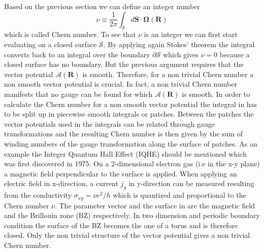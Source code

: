 \documentclass[a4paper,11pt]{report}
\begin{document}
Based on the previous section we can define an integer number
\begin{equation}\label{eq:3}
 \nu \equiv \frac{1}{2\pi}\int_\mathcal{S}d\bm{S}\cdot\bm{\Omega}(\bm{R})
\end{equation}
which is called Chern number. To see that $\nu$ is an integer we can first start evaluating  on a closed surface $\mathcal{S}$. By applying
again Stokes' theorem the integral converts back to an integral over the boundary $\partial \mathcal{S}$ which gives $\nu = 0$ because a closed 
surface has no boundary. But the previous argument requires that the vector potential $\bm{\mathcal{A}}(\bm{R})$ is smooth. Therefore, for a non trivial
Chern number a non smooth vector potential is crucial. In fact, a non trivial Chern number manifests that no gauge can be found for which 
$\bm{\mathcal{A}}(\bm{R})$ is smooth. In order to calculate the Chern number for a non smooth vector potential the integral in  has to
be split up in piecewise smooth integrals or patches. Between the patches the vector potentials used in the integrals can be related through gauge
transformations and the resulting Chern number is then given by the sum of winding numbers of the gauge transformation along the 
surface of patches\cite[p.31]{Bernevig2013}.
As an example the Integer Quantum Hall Effect (IQHE) should be mentioned which was first discovered in 1975. On a 2-dimensional electron gas (i.e in the x-y plane)
a magnetic field perpendicular to the surface is applied. When applying an electric field in x-direction, a current $j_y$ in y-direction
can be measured resulting from the conductivity $\sigma_{xy} = \nu e^2/h$ which is quantized and proportional to the Chern number $\nu$. 
The parameter vector and the surface in  are the magnetic field and
the Brillouin zone (BZ) respectively. In two dimension and periodic boundary condition the surface of the BZ becomes the one of a torus and is therefore
closed. Only the non trivial structure of the vector potential gives a non trivial Chern number. 
\end{document}
